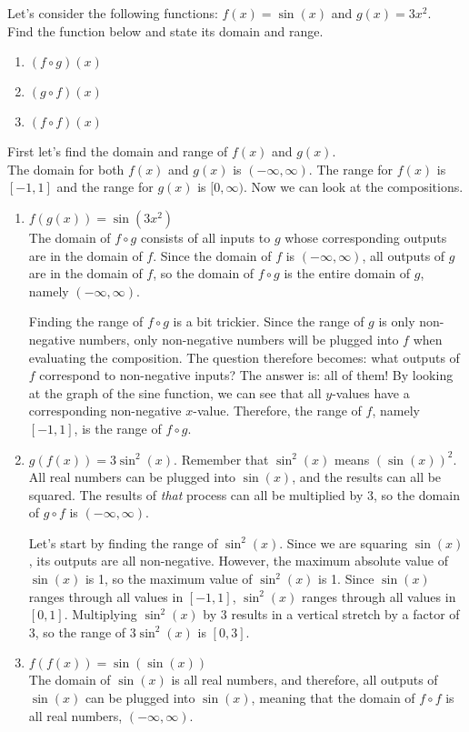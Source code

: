 \documentclass{ximera}
\begin{document}
\begin{example}
Let's consider the following functions: $f(x)=\sin{(x)}$ and $g(x)=3x^2$.
\\
Find the function below and state its domain and range.
\begin{enumerate}
\item $(f \circ g)(x)$
\item $(g \circ f)(x)$
\item $(f \circ f)(x)$
\end{enumerate}

\begin{explanation}
First let's find the domain and range of $f(x)$ and $g(x)$.\\
The domain for both $f(x)$ and $g(x)$ is $(-\infty , \infty)$. The range for $f(x)$ is $[-1,1]$ and the range for $g(x)$ is $[0,\infty)$. Now we can look at the compositions.
\begin{enumerate}
\item $f(g(x))= \sin(3x^2)$\\
The domain of $f \circ g$ consists of all inputs to $g$ whose corresponding outputs are in the domain of $f$.  Since the domain of $f$ is $(-\infty, \infty)$, all outputs of $g$ are in the domain of $f$, so the domain of $f \circ g$ is the entire domain of $g$, namely $(-\infty , \infty)$.

Finding the range of $f \circ g$ is a bit trickier. Since the range of $g$ is only non-negative numbers, only non-negative numbers will be plugged into $f$ when evaluating the composition. The question therefore becomes: what outputs of $f$ correspond to non-negative inputs? The answer is: all of them! By looking at the graph of the sine function, we can see that all $y$-values have a corresponding non-negative $x$-value. Therefore, the range of $f$, namely $[-1, 1]$, is the range of $f \circ g$.

\item $g(f(x)) =3\sin^2(x)$. Remember that $\sin^2(x)$ means $(\sin(x))^2$.\\
All real numbers can be plugged into $\sin(x)$, and the results can all be squared. The results of \textit{that} process can all be multiplied by 3, so the domain of $g \circ f$ is $(-\infty, \infty)$.

Let's start by finding the range of $\sin^2(x)$. Since we are squaring $\sin(x)$, its outputs are all non-negative. However, the maximum absolute value of $\sin(x)$ is 1, so the maximum value of $\sin^2(x)$ is 1. Since $\sin(x)$ ranges through all values in $[-1, 1]$, $\sin^2(x)$ ranges through all values in $[0, 1]$. Multiplying $\sin^2(x)$ by 3 results in a vertical stretch by a factor of 3, so the range of $3\sin^2(x)$ is $[0, 3]$. 
\item $f(f(x))= \sin(\sin(x))$\\
The domain of $\sin(x)$ is all real numbers, and therefore, all outputs of $\sin(x)$ can be plugged into $\sin(x)$, meaning that the domain of $f \circ f$ is all real numbers, $(-\infty, \infty)$. 


\end{enumerate}
\end{explanation}
\end{example}
\end{document}
